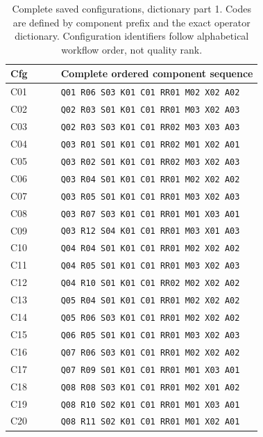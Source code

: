 \begin{table}[p]
\centering
\small
\setlength{\tabcolsep}{4pt}
\caption{Complete saved configurations, dictionary part 1. Codes are defined by component prefix and the exact operator dictionary. Configuration identifiers follow alphabetical workflow order, not quality rank.}
\label{tab:rag-config-dictionary-1}
\begin{tabular}{@{}lp{0.80\linewidth}@{}}
\toprule
Cfg & Complete ordered component sequence \\
\midrule
C01 & \texttt{Q01 R06 S03 K01 C01 RR01 M02 X02 A02} \\
C02 & \texttt{Q02 R03 S01 K01 C01 RR01 M03 X02 A03} \\
C03 & \texttt{Q02 R03 S03 K01 C01 RR02 M03 X03 A03} \\
C04 & \texttt{Q03 R01 S01 K01 C01 RR02 M01 X02 A01} \\
C05 & \texttt{Q03 R02 S01 K01 C01 RR02 M03 X02 A03} \\
C06 & \texttt{Q03 R04 S01 K01 C01 RR01 M02 X02 A02} \\
C07 & \texttt{Q03 R05 S01 K01 C01 RR01 M03 X02 A03} \\
C08 & \texttt{Q03 R07 S03 K01 C01 RR01 M01 X03 A01} \\
C09 & \texttt{Q03 R12 S04 K01 C01 RR01 M03 X01 A03} \\
C10 & \texttt{Q04 R04 S01 K01 C01 RR01 M02 X02 A02} \\
C11 & \texttt{Q04 R05 S01 K01 C01 RR01 M03 X02 A03} \\
C12 & \texttt{Q04 R10 S01 K01 C01 RR02 M02 X02 A02} \\
C13 & \texttt{Q05 R04 S01 K01 C01 RR01 M02 X02 A02} \\
C14 & \texttt{Q05 R06 S03 K01 C01 RR01 M02 X02 A02} \\
C15 & \texttt{Q06 R05 S01 K01 C01 RR01 M03 X02 A03} \\
C16 & \texttt{Q07 R06 S03 K01 C01 RR01 M02 X02 A02} \\
C17 & \texttt{Q07 R09 S01 K01 C01 RR01 M01 X03 A01} \\
C18 & \texttt{Q08 R08 S03 K01 C01 RR01 M02 X01 A02} \\
C19 & \texttt{Q08 R10 S02 K01 C01 RR01 M01 X03 A01} \\
C20 & \texttt{Q08 R11 S02 K01 C01 RR01 M01 X02 A01} \\
\bottomrule
\end{tabular}
\end{table}

